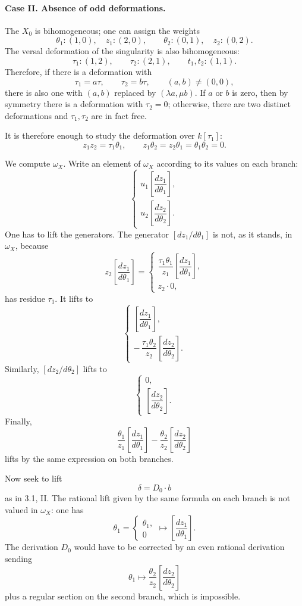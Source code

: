 \documentclass[11pt]{article}
\begin{document}
\paragraph{Case II. Absence of odd deformations.}
The $X_0$ is bihomogeneous; one can assign the weights
\[
  \theta_1:(1,0),\quad z_1:(2,0),\qquad
  \theta_2:(0,1),\quad z_2:(0,2).
\]
The versal deformation of the singularity is also bihomogeneous:
\[
  \tau_1:(1,2),\qquad \tau_2:(2,1),\qquad
  t_1,t_2:(1,1).
\]
Therefore, if there is a deformation with
\[
  \tau_1=a\tau,\qquad \tau_2=b\tau,\qquad (a,b)\ne(0,0),
\]
there is also one with $(a,b)$ replaced by $(\lambda a,\mu b)$. If $a$ or $b$ is zero, then by symmetry there is a deformation with $\tau_2=0$; otherwise, there are two distinct deformations and $\tau_1,\tau_2$ are in fact free.

It is therefore enough to study the deformation over $k[\tau_1]$:
\[
  z_1z_2=\tau_1\theta_1,\qquad
  z_1\theta_2=z_2\theta_1=\theta_1\theta_2=0.
\]

We compute $\omega_X$. Write an element of $\omega_X$ according to its values on each branch:
\[
  \begin{cases}
  u_1\left[\dfrac{dz_1}{d\theta_1}\right],\\[2mm]
  u_2\left[\dfrac{dz_2}{d\theta_2}\right].
  \end{cases}
\]
One has to lift the generators. The generator $\left[dz_1/d\theta_1\right]$ is not, as it stands, in $\omega_X$, because
\[
 z_2\left[\frac{dz_1}{d\theta_1}\right]
 =
 \begin{cases}
 \dfrac{\tau_1\theta_1}{z_1}\left[\dfrac{dz_1}{d\theta_1}\right],\\[2mm]
 z_2\cdot0,
 \end{cases}
\]
has residue $\tau_1$. It lifts to
\[
  \begin{cases}
  \left[\dfrac{dz_1}{d\theta_1}\right],\\[2mm]
  -\,\dfrac{\tau_1\theta_2}{z_2}\left[\dfrac{dz_2}{d\theta_2}\right].
  \end{cases}
\]
Similarly, $\left[dz_2/d\theta_2\right]$ lifts to
\[
  \begin{cases}
  0,\\[1mm]
  \left[\dfrac{dz_2}{d\theta_2}\right].
  \end{cases}
\]
Finally,
\[
  \frac{\theta_1}{z_1}\left[\frac{dz_1}{d\theta_1}\right]
  -
  \frac{\theta_2}{z_2}\left[\frac{dz_2}{d\theta_2}\right]
\]
lifts by the same expression on both branches.

Now seek to lift
\[
  \delta=D_0\cdot b
\]
as in 3.1, II. The rational lift given by the same formula on each branch is not valued in $\omega_X$: one has
\[
  \theta_1=
  \begin{cases}
  \theta_1,\\
  0
  \end{cases}
  \longmapsto
  \left[\frac{dz_1}{d\theta_1}\right].
\]
The derivation $D_0$ would have to be corrected by an even rational derivation sending
\[
  \theta_1\longmapsto
  \frac{\theta_2}{z_2}\left[\frac{dz_2}{d\theta_2}\right]
\]
plus a regular section on the second branch, which is impossible.
\end{document}
